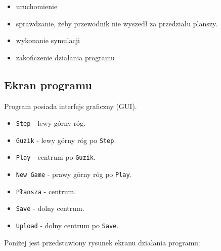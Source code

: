 \documentclass[a4paper, 12pt]{article}
\begin{document}
			\begin{itemize}
			\item uruchomienie
			\item sprawdzanie, żeby przewodnik nie wyszedł za przedziału planszy.
			\item wykonanie symulacji
			\item zakończenie działania programu
			\end{itemize}

		\subsection{Ekran programu}
			\hspace*{1cm} Program posiada interfejs graficzny (GUI).
			
			\begin{itemize}
			\item \texttt{Step} - lewy górny róg.
			\item \texttt{Guzik} - lewy górny róg po \texttt{Step}.
			\item \texttt{Play} - centrum po \texttt{Guzik}.
			\item \texttt{New Game} - prawy górny róg po \texttt{Play}.
			\item \texttt{Płansza} - centrum.
			\item \texttt{Save} - dolny centrum.
			\item \texttt{Upload} - dolny centrum po \texttt{Save}.
			\end{itemize}
			
			\hspace*{1cm} Poniżej jest przedstawiony rysunek ekranu działania programu:
			
\end{document}
